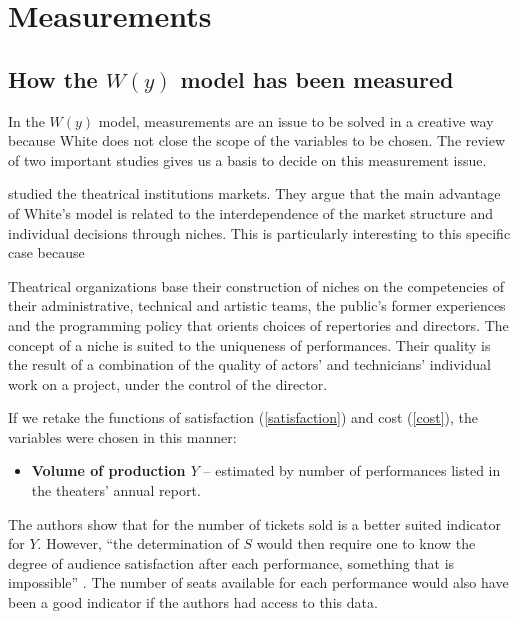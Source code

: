 \documentclass[a4paper, 12pt, openright, oneside, german, french, brazil, english]{abntex2}
\begin{document}
	\section{Measurements}

        \subsection{How the $W(y)$ model has been measured}
	
	In the $W(y)$ model, measurements are an issue to be solved in a creative way because White does not close the scope of the variables to be chosen. The review of two important studies gives us a basis to decide on this measurement issue.
	
	 studied the theatrical institutions markets. They argue that the main advantage of White's model is related to the interdependence of the market structure and individual decisions through niches. This is particularly interesting to this specific case because
	
	\begin{citacao}
		Theatrical organizations base their construction of niches on the competencies of their administrative, technical and artistic teams, the public's former experiences and the programming policy that orients choices of repertories and directors. The concept of a niche is suited to the uniqueness of performances. Their quality is the result of a combination of the quality of actors' and technicians' individual work on a project, under the control of the director. \cite[p. 255]{biencourt2002market}
	\end{citacao}
	
	
	If we retake the functions of satisfaction (\ref{satisfaction}) and cost (\ref{cost}), the variables were chosen in this manner:
	
	\begin{itemize}
		\item \textbf{Volume of production $Y$} -- estimated by number of performances listed in the theaters' annual report.
	\end{itemize}

	The authors show that for  the number of tickets sold is a better suited indicator for $Y$. However, ``the determination of $S$ would then require one to know the degree of audience satisfaction after each performance, something that is impossible'' \cite[p. 264]{biencourt2002market}. The number of seats available for each performance would also have been a good indicator if the authors had access to this data.
	
\end{document}
